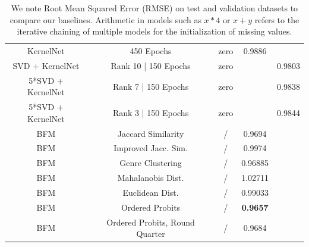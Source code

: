 \documentclass[10pt,conference,compsocconf]{IEEEtran}
\begin{document}
\begin{table}
{\begin{tabular}{|| c | c | c | c | c ||}
                KernelNet         & 450 Epochs                        & zero                    & 0.9886                 &                         \\
                SVD + KernelNet   & Rank 10 | 150 Epochs              & zero                    &                        & 0.9803                  \\
                5*SVD + KernelNet & Rank 7 | 150 Epochs               & zero                    &                        & 0.9838                  \\
                5*SVD + KernelNet & Rank 3 | 150 Epochs               & zero                    &                        & 0.9844                  \\

                \hline
                BFM               & Jaccard Similarity                & /                       & 0.9694                 &                         \\
                BFM               & Improved Jacc. Sim.               & /                       & 0.9974                 &                         \\
                BFM               & Genre Clustering                  & /                       & 0.96885                &                         \\
                BFM               & Mahalanobis Dist.                 & /                       & 1.02711                &                         \\
                BFM               & Euclidean Dist.                   & /                       & 0.99033                &                         \\
                BFM               & Ordered Probits                   & /                       & \textbf{ 0.9657 }      &                         \\
                BFM               & Ordered Probits, Round Quarter    & /                       & 0.9684                 &                         \\
                \hline
            \end{tabular}
        }
        \caption{We note Root Mean Squared Error (RMSE) on test and validation datasets to compare our baselines.
        Arithmetic in models such as $x * 4$ or $x + y$ refers to the iterative chaining of multiple models for the initialization of missing values.
        }
        \label{tab:ablation}
    \end{table}
\end{document}
